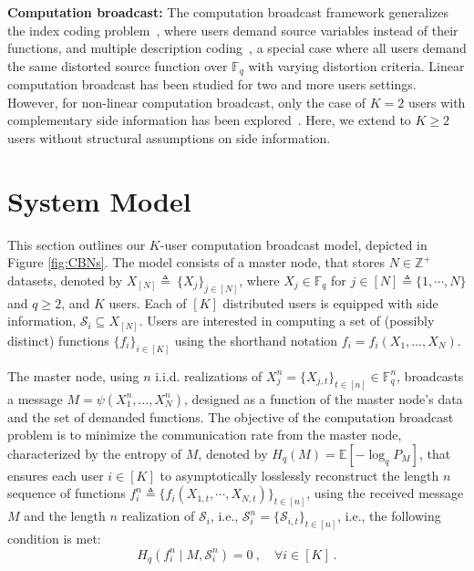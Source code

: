 \documentclass[conference, letterpaper]{IEEEtran} %
\begin{document}
\textbf{Computation broadcast:} 
The computation broadcast framework generalizes the index coding problem~\cite{arbabjolfaei2018fundamentals}, where users demand source variables instead of their functions, and multiple description coding~\cite{gamal1982achievable}, a special case where all users demand the same distorted source function over $\mathbb{F}_q$ with varying distortion criteria. Linear computation broadcast has been studied for two and more users settings\cite{yao2024capacity,yao2024generic}. However, for non-linear computation broadcast, only the case of $K=2$ users with complementary side information has been explored~\cite{ravi2016broadcast}. Here, we extend \cite{ravi2016broadcast} to $K\geq 2$ users without structural assumptions on side information.





\section{System Model}
\label{sec:sys-mod}
This section outlines our $K$-user computation broadcast model, depicted in Figure \ref{fig:CBNs}. The model consists of a master node, that stores $N\in\mathbb{Z}^+$ datasets, denoted by $X_{[N]}\triangleq~\{X_j\}_{j\in[N]}$, where $X_j \in \mathbb{F}_q$ for $j\in[N]\triangleq\{1,\cdots,N\}$ and $q \geq 2$, and $K$ users.
Each of $[K]$ distributed users is equipped with side information, $\mathcal{S}_i\subseteq X_{[N]}$. Users are interested in computing a set of (possibly distinct) functions $\{f_i\}_{i\in [K]}$ using the shorthand notation $f_i=f_{i}(X_1, \dots, X_N)$. 

The master node, using $n$ i.i.d. realizations of %
${X}^n_j=\{X_{j,t}\}_{t\in [n]}\in \mathbb{F}_{q}^{n}$, broadcasts a message $M=\psi(X^n_1,\dots, X^n_N)$, designed as a function of the master node's data and the set of demanded functions. The objective of the computation broadcast problem is to minimize the communication rate from the master node, characterized by the entropy of $M$, denoted by $H_q(M)=\mathbb{E}[- \log_{q}P_{M}]$, that ensures each user $i\in[K]$ to asymptotically losslessly reconstruct the length $n$ sequence of functions $f_i^n\triangleq\{f_{i}({X}_{1,t}, \cdots, X_{N,t})\}_{t\in[n]}$, using the received message $M$ and  the length $n$ realization of $\mathcal{S}_i$, i.e.,  $\mathcal{S}_{i}^{n}=\{\mathcal{S}_{i,t}\}_{t\in[n]}$, i.e., the following condition is met:
\begin{equation}
\label{Recovery_condition}
    H_q(f_{i}^n\mid M, \mathcal{S}^n_{i})=0\ , \quad \forall i\in [K] \ .
\end{equation}
\end{document}
